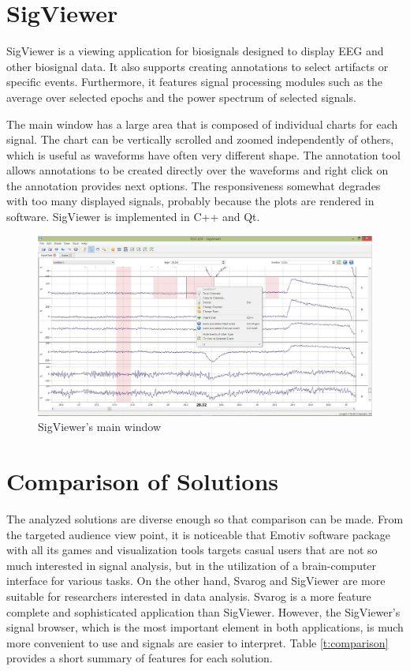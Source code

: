 \section{SigViewer}
SigViewer is a viewing application for biosignals designed to display EEG and other biosignal data. It also supports creating annotations to select artifacts or specific events. Furthermore, it features signal processing modules such as the average over selected epochs and the power spectrum of selected signals. 

The main window has a large area that is composed of individual charts for each signal. The chart can be vertically scrolled and zoomed independently of others, which is useful as waveforms have often very different shape. The annotation tool allows annotations to be created directly over the waveforms and right click on the annotation provides next options. The responsiveness somewhat degrades with too many displayed signals, probably because the plots are rendered in software. SigViewer is implemented in C++ and Qt.

\begin{figure}[htb]
	\centering
	\includegraphics[width=0.8\linewidth]{fig/sigviewer.jpg}
	\caption{SigViewer's main window}
	\label{fig:sigviewer}
\end{figure}

\section{Comparison of Solutions}
The analyzed solutions are diverse enough so that comparison can be made. From the targeted audience view point, it is noticeable that Emotiv software package with all its games and visualization tools targets casual users that are not so much interested in signal analysis, but in the utilization of a brain-computer interface for various tasks. On the other hand, Svarog and SigViewer are more suitable for researchers interested in data analysis. Svarog is a more feature complete and sophisticated application than SigViewer. However, the SigViewer's signal browser, which is the most important element in both applications, is much more convenient to use and signals are easier to interpret. Table \ref{t:comparison} provides a short summary of features for each solution. 

